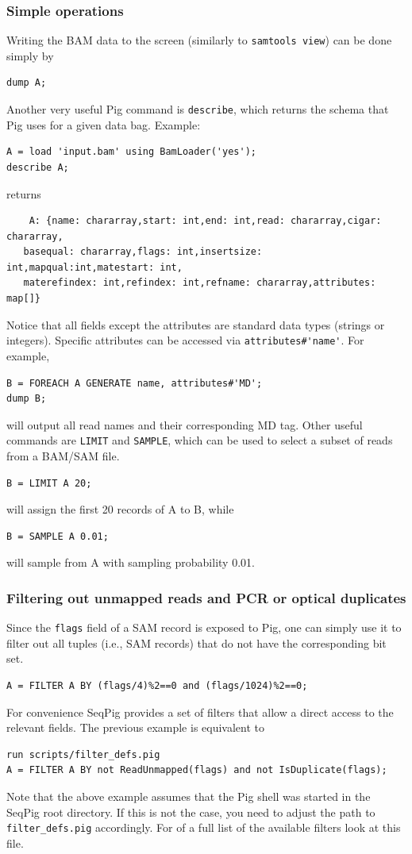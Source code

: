 \subsubsection{Simple operations}

Writing the BAM data to the screen (similarly to {\tt samtools view})
can be done simply by
\begin{lstlisting}
dump A;
\end{lstlisting}
Another very useful Pig command is {\tt describe}, which returns the schema that Pig
uses for a given data bag. Example:
\begin{lstlisting}
A = load 'input.bam' using BamLoader('yes');
describe A;
\end{lstlisting}
returns
\begin{lstlisting}  
	A: {name: chararray,start: int,end: int,read: chararray,cigar: chararray,
   basequal: chararray,flags: int,insertsize: int,mapqual:int,matestart: int,
   materefindex: int,refindex: int,refname: chararray,attributes: map[]}
\end{lstlisting}
Notice that all fields except the attributes are standard data types (strings
or integers). Specific attributes can be accessed via \verb|attributes#'name'|. For
example,
\begin{lstlisting} 
B = FOREACH A GENERATE name, attributes#'MD';
dump B;
\end{lstlisting}
will output all read names and their corresponding MD tag.
Other useful commands are {\tt LIMIT} and {\tt SAMPLE}, which can be used to
select a subset of reads from a BAM/SAM file.
\begin{lstlisting} 
B = LIMIT A 20;
\end{lstlisting}
will assign the first 20 records of A to B, while
\begin{lstlisting}
B = SAMPLE A 0.01;
\end{lstlisting}
will sample from A with sampling probability 0.01.

\subsubsection{Filtering out unmapped reads and PCR or optical duplicates}
Since the {\tt flags} field of a SAM record is exposed to Pig, one can simply
use it to filter out all tuples (i.e., SAM records) that do not have the
corresponding bit set.
\begin{lstlisting}
A = FILTER A BY (flags/4)%2==0 and (flags/1024)%2==0;
\end{lstlisting}
For convenience SeqPig provides a set of filters that allow a direct access
to the relevant fields. The previous example is equivalent to
\begin{lstlisting}
run scripts/filter_defs.pig
A = FILTER A BY not ReadUnmapped(flags) and not IsDuplicate(flags);
\end{lstlisting}
Note that the above example assumes that the Pig shell was started in
the SeqPig root directory. If this is not the case, you need to adjust
the path to {\tt filter\_defs.pig} accordingly. For of a full list of
the available filters look at this file.

